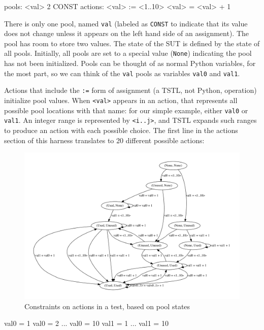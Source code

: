 {\scriptsize
\begin{code}
pools:
  <val> 2 CONST
\vspace{0.05in}
actions:
\vspace{0.05in}
<val> := <1..10>
<val> = <val> + 1
\end{code}
}

There is only one pool, named {\tt val} (labeled as {\tt CONST} to
indicate that its value does not change unless it appears on the left
hand side of an assignment).  The pool has room to store
two values.  The state of the SUT is defined by the state of all
pools.  Initially, all pools are set to a special value ({\tt None}) indicating the
pool has not been initialized.  Pools can be thought of as 
normal Python variables, for the most part, so we can think of the
{\tt val} pools as variables {\tt val0} and {\tt val1}.

Actions that include the {\tt :=} form of assignment (a TSTL, not
Python, operation) initialize pool values.  When {\tt <val>} appears
in an action, that represents all possible pool locations with that
name:  for our simple example, either {\tt val0} or {\tt val1}.  An
integer range is represented by {\tt <i..j>}, and TSTL expands such
ranges to produce an action with each possible choice. The
first line in the actions section of this harness translates to 20
different possible actions:

\begin{figure}
\includegraphics[width=\columnwidth]{states}
\caption{Constraints on actions in a test, based on pool states}
\label{fig:poolacts}
\end{figure}

{\scriptsize
\begin{code}
val0 = 1
val0 = 2 ...
val0 = 10
val1 = 1 ...
val1 = 10
\end{code}
}

